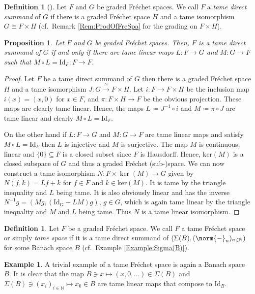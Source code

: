 \documentclass[12pt,a4paper]{article}
\theoremstyle{plain}
\newtheorem{proposition}[theorem]{Proposition}
\theoremstyle{definition}
\newtheorem{definition}[theorem]{Definition}
\newtheorem{example}[theorem]{Example}
\newcommand{\N}{\mathbb{N}}
\newcommand{\nnorm}[2]{\norm{#1}_{#2}}
\begin{document}
\begin{definition}[{\cite[Part II, Definition 1.3.1]{hamilton}}]
\label{Def:TameDirSummand}
Let $F$ and $G$ be graded Fréchet spaces. We call $F$ a \textit{tame direct summand} of $G$ if there is a graded Fréchet space $H$ and a tame isomorphism $G\cong F\times H$ (cf.~Remark \ref{Rem:ProdOfFreSpa} for the grading on $F\times H$).    
\end{definition}


\begin{proposition}
\label{Prop:TameDirSumBySequence}
Let $F$ and $G$ be graded Fréchet spaces. Then, $F$ is a tame direct summand of $G$ if and only if there are tame linear maps $L:F\to G$ and $M:G\to F$ such that $M\circ L=\mathrm{Id}_F:F\to F$. 
\end{proposition}
\begin{proof}
Let $F$ be a tame direct summand of $G$ then there is a graded Fréchet space $H$ and a tame isomorphism $J:G\xrightarrow{\cong} F\times H$. Let $i:F\to F\times H$ be the inclusion map $i(x)=(x,0)$ for $x\in F$, and $\pi:F\times H\to F$ be the obvious projection. These maps are clearly tame linear. Hence, the maps $L\coloneqq J^{-1}\circ i$ and $M\coloneqq\pi\circ J$ are tame linear and clearly $M\circ L=\mathrm{Id}_F$. 

On the other hand if $L:F\to G$ and $M:G\to F$ are tame linear maps and satisfy $M\circ L=\mathrm{Id}_F$ then $L$ is injective and $M$ is surjective. The map $M$ is continuous, linear and $\{0\}\subseteq F$ is a closed subset since $F$ is Hausdorff. Hence, $\mathrm{ker}(M)$ is a closed subspace of $G$ and thus a graded Fréchet (sub-)space. We can now construct a tame isomorphism $N:F\times \operatorname{ker}(M)\to G$ given by $N(f,k)=Lf+k$ for $f\in F$ and $k\in \mathrm{ker}(M)$. It is tame by the triangle inequality and $L$ being tame. It is also obviously linear and has the inverse $N^{-1}g=(Mg,(\mathrm{Id_G}-LM)g)$, $g\in G$, which is again tame linear by the triangle inequality and $M$ and $L$ being tame. Thus $N$ is a tame linear isomorphism.    
\end{proof}


\begin{definition}
Let $F$ be a graded Fréchet space. We call $F$ a tame Fréchet space or simply \textit{tame space} if it is a tame direct summand of $(\Sigma(B),(\nnorm{-}{n})_{n\in \N})$ for some Banach space $B$ (cf.~Example \ref{Example:Sigma(B)}).
\end{definition}

\begin{example}
\label{Ex:BanachSpacesAreTameFre}
A trivial example of a tame Fréchet space is again a Banach space $B$. It is clear that the map $B\ni x\mapsto (x,0,\ldots)\in \Sigma(B)$ and $\Sigma(B)\ni (x_i)_{i\in \N}\mapsto x_0\in B$ are tame linear maps that compose to $\mathrm{Id}_B$. 
\end{example}
\end{document}

